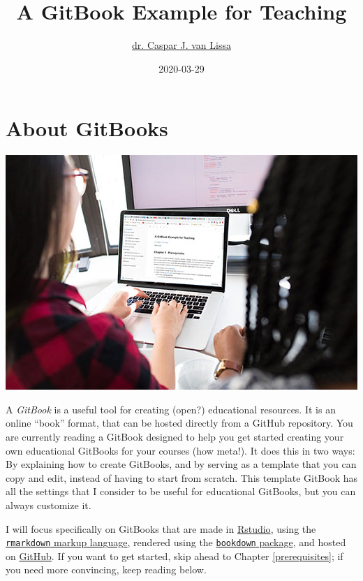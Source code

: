 \documentclass[
]{book}
\title{A GitBook Example for Teaching}
\author{\href{https://www.uu.nl/staff/CJvanLissa}{dr. Caspar J. van Lissa}}
\date{2020-03-29}
\begin{document}
\maketitle

{
\setcounter{tocdepth}{1}
\tableofcontents
}
\hypertarget{about-gitbooks}{%
\chapter{About GitBooks}\label{about-gitbooks}}

\includegraphics{./img/using_gitbook.jpeg}

A \emph{GitBook} is a useful tool for creating (open?) educational resources. It is an online ``book'' format, that can be hosted directly from a GitHub repository. You are currently reading a GitBook designed to help you get started creating your own educational GitBooks for your courses (how meta!). It does this in two ways: By explaining how to create GitBooks, and by serving as a template that you can copy and edit, instead of having to start from scratch. This template GitBook has all the settings that I consider to be useful for educational GitBooks, but you can always customize it.

I will focus specifically on GitBooks that are made in \href{www.rstudio.com}{Rstudio}, using the \href{https://rstudio.com/wp-content/uploads/2016/03/rmarkdown-cheatsheet-2.0.pdf}{\texttt{rmarkdown} markup language}, rendered using the \href{https://bookdown.org/yihui/bookdown/get-started.html}{\texttt{bookdown} package}, and hosted on \href{https://github.com/}{GitHub}. If you want to get started, skip ahead to Chapter \ref{prerequisites}; if you need more convincing, keep reading below.
\end{document}
